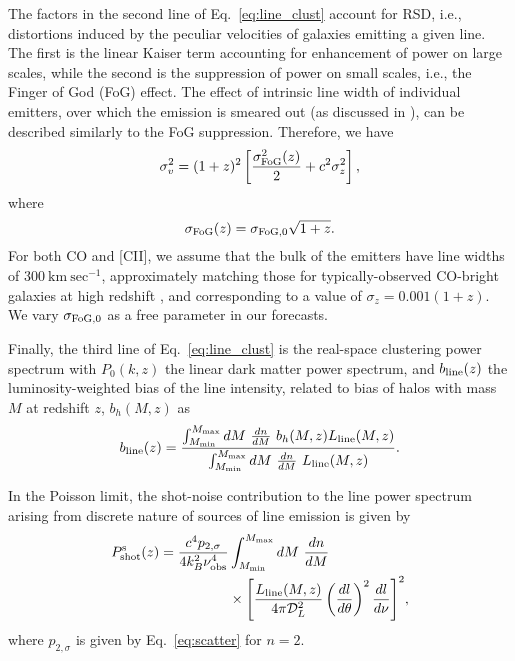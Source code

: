 \documentclass[twocolumn]{aastex631}
\begin{document}
The factors in the second line of Eq.~\eqref{eq:line_clust} account for RSD, i.e., distortions induced by the peculiar velocities of galaxies emitting a given line. The first is the linear Kaiser term accounting for enhancement of power on large scales, while the second is the suppression of power on small scales, i.e., the Finger of God (FoG) effect. The effect of intrinsic line width of individual emitters, over which the emission is smeared out (as discussed in \citealt{Keating:2020wlx}), can be described similarly to the FoG suppression. Therefore, we have
\begin{equation}\label{eq:disp}
    \sigma_v^2 = (1+z)^2 \left[\frac{\sigma^2_{\rm FoG}(z)}{2} + c^2 \sigma_z^2\right],
\end{equation}
where 
\begin{equation}
    \sigma_{\rm FoG}(z) = \sigma_{\rm FoG,0} \sqrt{1+z}.
\end{equation}
For both CO and [CII], we assume that the bulk of the emitters have line widths of $300 \ \textrm{km}\ \textrm{sec}^{-1}$, approximately matching those for typically-observed CO-bright galaxies at high redshift \citep{Tacconi:2013gf}, and corresponding to a value of $\sigma_z = 0.001(1+z)$. We vary $\sigma_{\rm FoG,0}$ as a free parameter in our forecasts. 

Finally, the third line of Eq.~\eqref{eq:line_clust} is the real-space clustering power spectrum with $P_0(k,z)$ the linear dark matter power spectrum, and $b_{\rm line}(z)$ the luminosity-weighted bias of the line intensity, related to bias of halos with mass $M$ at redshift $z$, $b_h(M,z)$ as 
\begin{equation}\label{eq:line_bias}
b_{\rm line}(z) = \frac{\int_{M_{\rm min}}^{M_{\rm max}} dM  \ \frac{dn}{dM} \  b_h(M,z) L_{\rm line}(M,z)  
}{\int_{M_{\rm min}}^{M_{\rm max}} dM \ \frac{dn}{dM} \ L_{\rm line}(M,z)}.
\end{equation}

In the Poisson limit, the shot-noise contribution to the line power spectrum arising from discrete nature of sources of line emission is given by 
\begin{align}\label{eq:ps_shot}
P_{\rm shot}^{\rm s}(z) = \frac{c^4 p_{2,\sigma}}{4 k_B^2 \nu_{\rm obs}^4} 
& \int_{M_{\rm min}}^{M_{\rm max}} dM  \ \frac{dn}{dM} \notag \\ &\times{\left[\frac{L_{\rm line}(M,z)}{4 \pi \mathcal D_L^2} 
 \left ( \frac{dl}{d\theta} \right )^{2} \frac{dl}{d\nu} \right ]}^2,
\end{align} 
where $p_{2,\sigma}$ is given by Eq.~\eqref{eq:scatter} for $n=2$.
\end{document}
